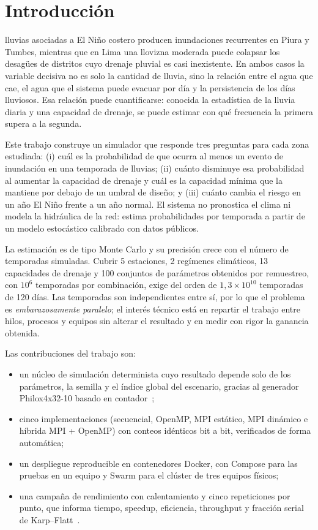 \section{Introducción}
\label{sec:introduccion}

 lluvias asociadas a El Niño costero producen inundaciones recurrentes en Piura y Tumbes, mientras que en Lima una llovizna moderada puede colapsar los desagües de distritos cuyo drenaje pluvial es casi inexistente. En ambos casos la variable decisiva no es solo la cantidad de lluvia, sino la relación entre el agua que cae, el agua que el sistema puede evacuar por día y la persistencia de los días lluviosos. Esa relación puede cuantificarse: conocida la estadística de la lluvia diaria y una capacidad de drenaje, se puede estimar con qué frecuencia la primera supera a la segunda.

Este trabajo construye un simulador que responde tres preguntas para cada zona estudiada: (i) cuál es la probabilidad de que ocurra al menos un evento de inundación en una temporada de lluvias; (ii) cuánto disminuye esa probabilidad al aumentar la capacidad de drenaje y cuál es la capacidad mínima que la mantiene por debajo de un umbral de diseño; y (iii) cuánto cambia el riesgo en un año El Niño frente a un año normal. El sistema no pronostica el clima ni modela la hidráulica de la red: estima probabilidades por temporada a partir de un modelo estocástico calibrado con datos públicos.

La estimación es de tipo Monte Carlo y su precisión crece con el número de temporadas simuladas. Cubrir 5 estaciones, 2 regímenes climáticos, 13 capacidades de drenaje y 100 conjuntos de parámetros obtenidos por remuestreo, con $10^{6}$ temporadas por combinación, exige del orden de $1{,}3\times10^{10}$ temporadas de 120 días. Las temporadas son independientes entre sí, por lo que el problema es \emph{embarazosamente paralelo}; el interés técnico está en repartir el trabajo entre hilos, procesos y equipos sin alterar el resultado y en medir con rigor la ganancia obtenida.

Las contribuciones del trabajo son:
\begin{itemize}
  \item un núcleo de simulación determinista cuyo resultado depende solo de los parámetros, la semilla y el índice global del escenario, gracias al generador Philox4x32-10 basado en contador~\cite{salmon2011};
  \item cinco implementaciones (secuencial, OpenMP, MPI estático, MPI dinámico e híbrida MPI + OpenMP) con conteos idénticos bit a bit, verificados de forma automática;
  \item un despliegue reproducible en contenedores Docker, con Compose para las pruebas en un equipo y Swarm para el clúster de tres equipos físicos;
  \item una campaña de rendimiento con calentamiento y cinco repeticiones por punto, que informa tiempo, speedup, eficiencia, throughput y fracción serial de Karp--Flatt~\cite{karp1990}.
\end{itemize}

